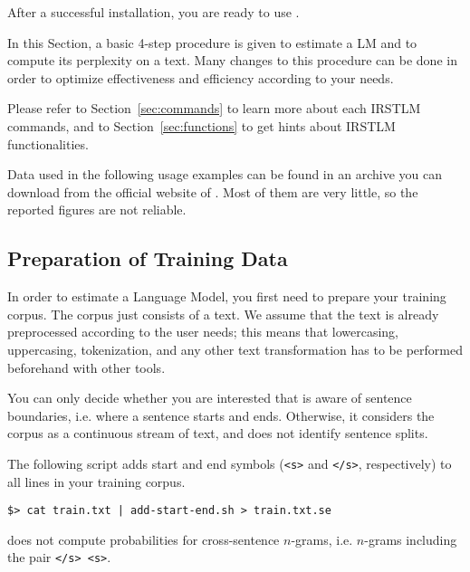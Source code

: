 After a successful installation, you are ready to use {\IRSTLM}.

\noindent
In this Section, a basic 4-step procedure is given to estimate a LM and to compute its perplexity on a text.
Many changes to this procedure can be done in order to optimize effectiveness and efficiency according to your needs.

\noindent 
Please refer to Section~\ref{sec:commands} to learn more about each IRSTLM commands, and 
to Section~\ref{sec:functions} to get hints about IRSTLM functionalities.





\noindent
Data used in the following usage examples can be found in an archive you can download from the official website of {\IRSTLM}.
Most of them are very little, so the reported figures are not reliable.

\subsection{Preparation of Training Data}
In order to estimate a Language Model, you first need to prepare your training corpus. The corpus just consists of a text.
We assume that the text is already preprocessed according to the user needs; this means that lowercasing, uppercasing, tokenization, and any other text transformation has to be performed beforehand with other tools.

\noindent
You can only decide whether you are interested that {\IRSTLM} is aware of sentence boundaries, i.e. where a sentence starts and ends. Otherwise, it considers the corpus as a continuous stream of text, and does not identify sentence splits. 

\noindent
The following script adds start and end symbols ({\tt <s>} and {\tt </s>}, respectively) to all lines in your training corpus.
\begin{verbatim}
$> cat train.txt | add-start-end.sh > train.txt.se
\end{verbatim}

\noindent
{\IRSTLM} does not compute probabilities for cross-sentence $n$-grams, i.e. $n$-grams including the pair {\tt </s>  <s>}.





